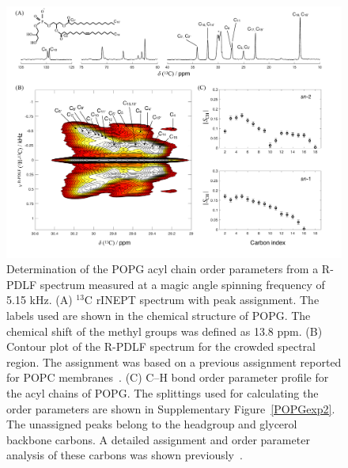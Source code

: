 \documentclass[fleqn,10pt]{wlscirepSI}
\begin{document}
\begin{figure}[p]
  \includegraphics[width=\textwidth]{Figures/POPG_INEPT_contour_SCH.pdf}
  \caption{Determination of the POPG acyl chain order parameters from a R-PDLF spectrum measured at a magic angle spinning frequency of 5.15 kHz. (A) $^{13}$C rINEPT spectrum with peak assignment. The labels used are shown in the chemical structure of POPG. The chemical shift of the methyl groups was defined as 13.8 ppm. (B) Contour plot of the R-PDLF spectrum for the crowded spectral region. The assignment was based on a previous assignment reported for POPC membranes~\cite{ferreira13}. (C) C--H bond order parameter profile for the acyl chains of POPG. The splittings used for calculating the order parameters are shown in Supplementary Figure~\ref{POPGexp2}. The unassigned peaks belong to the headgroup and glycerol backbone carbons. A detailed assignment and order parameter analysis of these carbons was shown previously~\cite{bacle21}.}
  \label{POPGexp1}
\end{figure}
\end{document}
